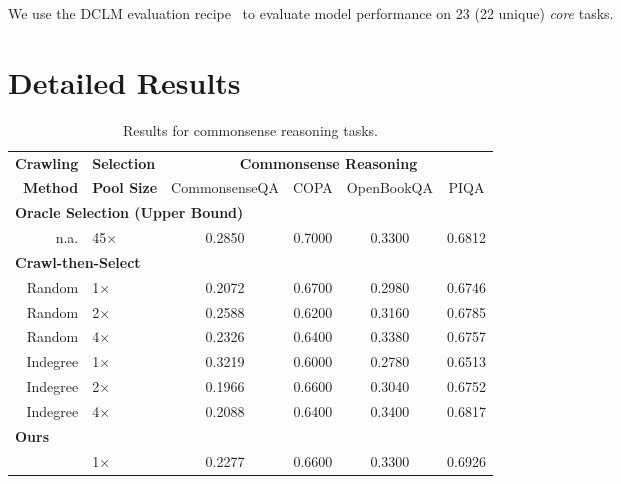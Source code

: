 We use the DCLM evaluation recipe~\citep{dclm} to evaluate model performance on 23 (22 unique) \textit{core} tasks. 

\section{Detailed Results}
\label{sec:appendix:result}

\begin{table*}
    \centering
    \begin{tabular}{rlcccc}
        \toprule
        \textbf{Crawling} & \textbf{Selection} & \multicolumn{4}{c}{\textbf{Commonsense Reasoning}} \\
        \textbf{Method} & \textbf{Pool Size} & CommonsenseQA & COPA & OpenBookQA & PIQA \\
        \midrule
        \multicolumn{6}{l}{\textbf{Oracle Selection (Upper Bound)}}\\
        n.a. & 45× & 0.2850 & 0.7000 & 0.3300 & 0.6812 \\
        \multicolumn{6}{l}{\textbf{Crawl-then-Select}}\\ 
        Random & 1× & 0.2072 & 0.6700 & 0.2980 & 0.6746 \\
        Random & 2× & 0.2588 & 0.6200 & 0.3160 & 0.6785 \\
        Random & 4× & 0.2326 & 0.6400 & 0.3380 & 0.6757 \\
        Indegree & 1× & 0.3219 & 0.6000 & 0.2780 & 0.6513 \\
        Indegree & 2× & 0.1966 & 0.6600 & 0.3040 & 0.6752 \\
        Indegree & 4× & 0.2088 & 0.6400 & 0.3400 & 0.6817 \\
        \multicolumn{6}{l}{\textbf{Ours}} \\
        \ours{} & 1× & 0.2277 & 0.6600 & 0.3300 & 0.6926 \\
        \bottomrule
    \end{tabular}
    \caption{Results for commonsense reasoning tasks.}
    \label{tab:commonsense_results}
\end{table*}

